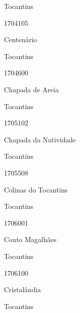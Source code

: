 \documentclass[
  letterpaper,
]{report}
\begin{document}
\n    

\n      

Tocantins

\n      

1704105

\n      

Centenário

\n    

\n    

\n      

Tocantins

\n      

1704600

\n      

Chapada de Areia

\n    

\n    

\n      

Tocantins

\n      

1705102

\n      

Chapada da Natividade

\n    

\n    

\n      

Tocantins

\n      

1705508

\n      

Colinas do Tocantins

\n    

\n    

\n      

Tocantins

\n      

1706001

\n      

Couto Magalhães

\n    

\n    

\n      

Tocantins

\n      

1706100

\n      

Cristalândia

\n    

\n    

\n      

Tocantins

\n      
\end{document}
